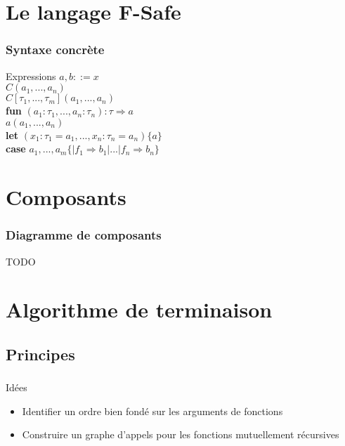 \section{Le langage F-Safe}

\begin{frame}
  \frametitle{Syntaxe concrète}
  \begin{block}{Expressions}
    $a, b ::= x$ \\
    \hspace{1,2cm}$C(a_1, ..., a_n)$ \\
    \hspace{1,2cm}$C[\tau_1, ..., \tau_m](a_1, ..., a_n)$ \\
    \hspace{1,2cm}\textbf{fun} $(a_1:\tau_1, ..., a_n:\tau_n) : \tau \Rightarrow a$ \\
    \hspace{1,2cm}$a(a_1, ..., a_n)$ \\
    \hspace{1,2cm}\textbf{let} $(x_1:\tau_1 = a_1, ..., x_n:\tau_n = a_n) \{ a \}$ \\
    \hspace{1,2cm}\textbf{case} $a_1, ..., a_m \{ | f_1 \Rightarrow b_1 | ... | f_n \Rightarrow b_n \}$
  \end{block}
\end{frame}

\section{Composants}

\begin{frame}
  \frametitle{Diagramme de composants}
  TODO
\end{frame}

\section{Algorithme de terminaison}

\subsection{Principes}

\begin{frame}
  \frametitle{}
  \begin{block}{Idées}
    \begin{itemize}
      \item Identifier un ordre bien fondé sur les arguments de fonctions
      \item Construire un graphe d'appels pour les fonctions
        mutuellement récursives
    \end{itemize}
  \end{block}
\end{frame}

